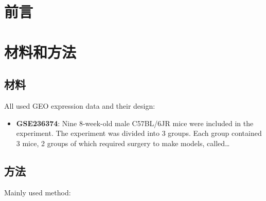 \documentclass[
]{article}
\providecommand{\tightlist}{%
  \setlength{\itemsep}{0pt}\setlength{\parskip}{0pt}}
\begin{document}
\hypertarget{introduction}{%
\section{前言}\label{introduction}}

\hypertarget{methods}{%
\section{材料和方法}\label{methods}}

\hypertarget{ux6750ux6599}{%
\subsection{材料}\label{ux6750ux6599}}

All used GEO expression data and their design:

\begin{itemize}
\tightlist
\item
  \textbf{GSE236374}: Nine 8-week-old male C57BL/6JR mice were included in the experiment. The experiment was divided into 3 groups. Each group contained 3 mice, 2 groups of which required surgery to make models, called\ldots{}
\end{itemize}

\hypertarget{ux65b9ux6cd5}{%
\subsection{方法}\label{ux65b9ux6cd5}}

Mainly used method:
\end{document}

